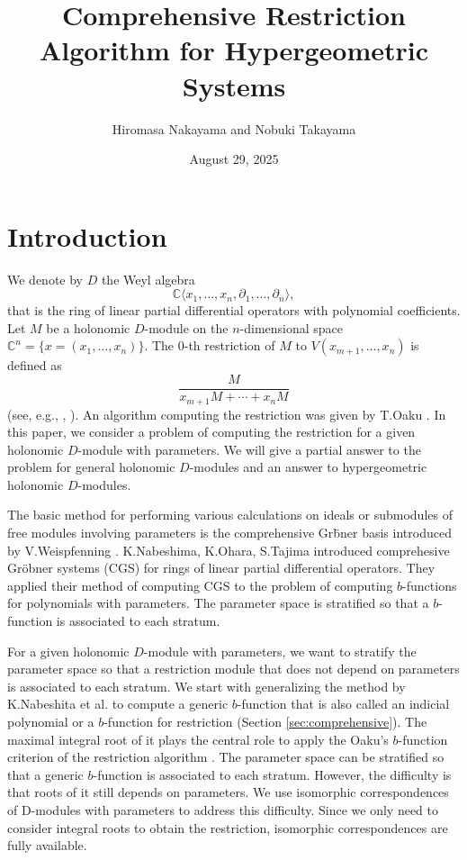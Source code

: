\documentclass{article}
\title{Comprehensive Restriction Algorithm for Hypergeometric Systems}
\author{Hiromasa Nakayama and Nobuki Takayama}
\date{August 29, 2025}
\def\CC{\mathbb{C}}
\def\pd#1{\partial_{#1}}
\begin{document}
\maketitle

\section{Introduction}

We denote by $D$ the Weyl algebra
$$\CC \langle x_1, \ldots, x_n, \pd{1}, \ldots, \pd{n} \rangle, $$
that is the ring of linear partial differential operators
with polynomial coefficients.
Let $M$ be a holonomic $D$-module 
on the $n$-dimensional space $\CC^n=\{ x=(x_1, \ldots, x_n) \}$.
The $0$-th restriction of $M$ to $V(x_{m+1}, \ldots, x_n)$ 
is defined as
$$
\frac{M}{x_{m+1}M + \cdots + x_n M}
$$
(see, e.g., \cite{bjork-2012}, \cite[Chap 5]{SST}).
An algorithm computing the restriction 
was given by T.Oaku \cite{oaku-1997}.
In this paper, we consider a problem of computing the restriction
for a given holonomic $D$-module with parameters.
We will give a partial answer to the problem for general holonomic $D$-modules
and an answer to hypergeometric holonomic $D$-modules.


The basic method for performing various calculations on ideals 
or submodules of free modules
involving parameters is 
the comprehensive Gr\"bner basis introduced 
by V.Weispfenning \cite{weispfenning-1992}.
K.Nabeshima, K.Ohara, S.Tajima \cite{not-2016} introduced comprehesive Gr\"obner systems
(CGS) for rings of linear partial differential operators.
They applied their method of computing CGS to the problem of computing
$b$-functions for polynomials with parameters.
The parameter space is stratified so that a $b$-function is associated
to each stratum.

For a given holonomic $D$-module with parameters,
we want to stratify the parameter space so that
a restriction module that does not depend on parameters
is associated to each stratum.
We start with generalizing the method by K.Nabeshita et al. 
to compute a generic $b$-function
that is also called an indicial polynomial or 
a $b$-function for restriction (Section \ref{sec:comprehensive}).
The maximal integral root of it plays the central role
to apply the Oaku's $b$-function criterion 
of the restriction algorithm \cite{oaku-1997}.
The parameter space can be stratified so that a generic $b$-function
is associated to each stratum.
However, the difficulty is that roots of it still depends on parameters.
We use isomorphic correspondences of D-modules with parameters
to address this difficulty.
Since we only need to consider integral roots to obtain the restriction, 
isomorphic correspondences are fully available.
\end{document}

